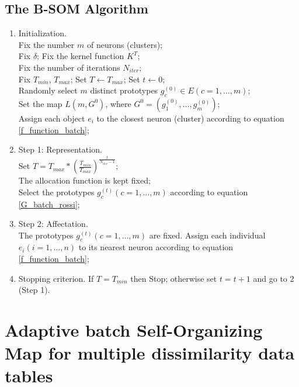 \documentclass[10pt, conference, compsocconf]{IEEEtran}
\begin{document}
\subsection{The B-SOM Algorithm}

\begin{enumerate}
\item Initialization.\\
Fix the number $m$ of neurons (clusters);\\
Fix $\delta$; Fix the kernel function $K^T$;\\
Fix the number of iterations $N_{iter}$;\\
Fix $T_{min}$, $T_{max}$; Set $T \leftarrow T_{max}$; Set $t \leftarrow 0$;\\
Randomly select $m$ distinct prototypes $g_c^{(0)} \in E (c = 1, \dots, m)$;\\
Set the map $L(m, G^0)$, where $G^0 = (g_1^{(0)}, \dots, g_m^{(0)})$;\\
Assign each object $e_i$ to the closest neuron (cluster) according to equation \ref{f_function_batch};\\

\item Step 1: Representation.\\
Set $T = T_{max}\ast (\frac{T_{min}}{T_{max}})^\frac{t}{N_{iter}-1}$;\\
The allocation function is kept fixed;\\
Select the prototypes $g_c^{(t)} (c = 1, \dots, m)$ according to equation \ref{G_batch_rossi};\\

\item Step 2: Affectation.\\
The prototypes $g_c^{(t)} (c = 1, \dots, m)$ are fixed. Assign each individual $e_i (i = 1, \dots, n)$ to its nearest neuron according to equation \ref{f_function_batch};\\

\item Stopping criterion.
If $T = T_{min}$ then Stop; otherwise set $t = t+1$ and go to 2 (Step 1).

\end{enumerate}


\section{Adaptive batch Self-Organizing Map for multiple dissimilarity data tables}\label{sec:adaptive_som}
\end{document}
